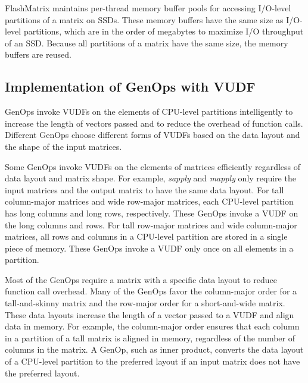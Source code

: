 FlashMatrix maintains per-thread memory buffer pools for accessing I/O-level
partitions of a matrix on SSDs. These memory buffers have the same size as
I/O-level partitions, which are in the order of megabytes to maximize I/O
throughput of an SSD. Because all partitions of a matrix have the same size,
the memory buffers are reused.

\subsection{Implementation of GenOps with VUDF}

GenOps invoke VUDFs on the elements of CPU-level partitions intelligently
to increase the length of vectors passed and to reduce the overhead of
function calls. Different GenOps choose different
forms of VUDFs based on the data layout and the shape of the input matrices.

Some GenOps invoke VUDFs on the elements of matrices efficiently regardless of
data layout and matrix shape.
For example, \textit{sapply} and \textit{mapply} only require
the input matrices and the output matrix to have the same data layout. For tall
column-major matrices and wide row-major matrices, each CPU-level partition has
long columns and long rows, respectively. These GenOps invoke a VUDF
on the long columns and rows. For tall row-major matrices and wide column-major
matrices, all rows and columns in a CPU-level partition are stored in a single
piece of memory. These GenOps invoke a VUDF only once on all
elements in a partition. %

Most of the GenOps require a matrix with a specific data layout to reduce
function call overhead.
Many of the GenOps favor the column-major order for a tall-and-skinny matrix
and the row-major order for a short-and-wide matrix. These data layouts increase
the length of a vector passed to a VUDF and align data in memory. For example,
the column-major order ensures that each column in a partition of a tall matrix
is aligned in memory, regardless of the number of columns in the matrix. A GenOp,
such as inner product, converts the data layout of a CPU-level partition to
the preferred layout if an input matrix does not have the preferred layout.

